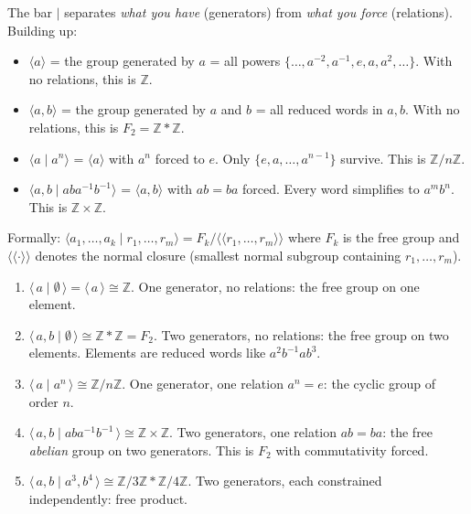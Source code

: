 \documentclass[11pt]{report}
\begin{document}
\begin{rembox}
The bar $\mid$ separates \emph{what you have} (generators) from \emph{what you force} (relations). Building up:
\begin{itemize}[nosep]
    \item $\langle a \rangle$ = the group generated by $a$ = all powers $\{\ldots, a^{-2}, a^{-1}, e, a, a^2, \ldots\}$. With no relations, this is $\mathbb{Z}$.
    \item $\langle a, b \rangle$ = the group generated by $a$ and $b$ = all reduced words in $a, b$. With no relations, this is $F_2 = \mathbb{Z} * \mathbb{Z}$.
    \item $\langle a \mid a^n \rangle$ = $\langle a \rangle$ with $a^n$ forced to $e$. Only $\{e, a, \ldots, a^{n-1}\}$ survive. This is $\mathbb{Z}/n\mathbb{Z}$.
    \item $\langle a, b \mid aba^{-1}b^{-1} \rangle$ = $\langle a, b \rangle$ with $ab = ba$ forced. Every word simplifies to $a^m b^n$. This is $\mathbb{Z} \times \mathbb{Z}$.
\end{itemize}

Formally: $\langle a_1, \ldots, a_k \mid r_1, \ldots, r_m \rangle = F_k / \langle\!\langle r_1, \ldots, r_m \rangle\!\rangle$ where $F_k$ is the free group and $\langle\!\langle \cdot \rangle\!\rangle$ denotes the normal closure (smallest normal subgroup containing $r_1, \ldots, r_m$).
\end{rembox}

\begin{exbox}
\begin{enumerate}
    \item $\langle\, a \mid \emptyset\,\rangle = \langle\, a \,\rangle \cong \mathbb{Z}$. One generator, no relations: the free group on one element.

    \item $\langle\, a, b \mid \emptyset\,\rangle \cong \mathbb{Z} * \mathbb{Z} = F_2$. Two generators, no relations: the free group on two elements. Elements are reduced words like $a^2 b^{-1} a b^3$.

    \item $\langle\, a \mid a^n \,\rangle \cong \mathbb{Z}/n\mathbb{Z}$. One generator, one relation $a^n = e$: the cyclic group of order $n$.

    \item $\langle\, a, b \mid aba^{-1}b^{-1} \,\rangle \cong \mathbb{Z} \times \mathbb{Z}$. Two generators, one relation $ab = ba$: the free \emph{abelian} group on two generators. This is $F_2$ with commutativity forced.

    \item $\langle\, a, b \mid a^3, b^4 \,\rangle \cong \mathbb{Z}/3\mathbb{Z} * \mathbb{Z}/4\mathbb{Z}$. Two generators, each constrained independently: free product.
\end{enumerate}
\end{exbox}
\end{document}
